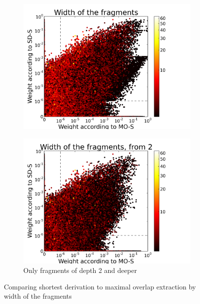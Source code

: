 \begin{figure}[t]
\center
\begin{subfigure}{0.45\textwidth}
\includegraphics[width=\linewidth,trim=0.5cm 0cm 2.5cm 0.5cm, clip=true]{../data/plots/6.png}
\caption{}
\label{f:width1a}
\end{subfigure}
\begin{subfigure}{0.45\textwidth}
\includegraphics[width=\linewidth,trim=0.5cm 0cm 2.5cm 0.5cm, clip=true]{../data/plots/9.png}
\caption{Only fragments of depth 2 and deeper}
\label{f:width1b}
\end{subfigure}
\caption{Comparing shortest derivation to maximal overlap extraction by width of the fragments}
\label{f:width1}
\end{figure}






























